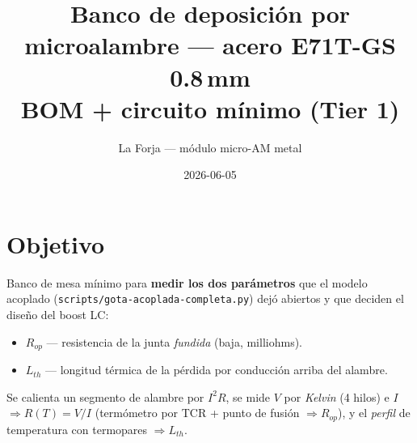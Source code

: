 \documentclass[11pt]{article}
\title{Banco de deposici\'on por microalambre --- acero E71T-GS 0.8\,mm\\
\large BOM + circuito m\'inimo (Tier 1)}
\author{La Forja --- m\'odulo micro-AM metal}
\date{2026-06-05}
\begin{document}
\maketitle

\section*{Objetivo}
Banco de mesa m\'inimo para \textbf{medir los dos par\'ametros} que el modelo acoplado
(\texttt{scripts/gota-acoplada-completa.py}) dej\'o abiertos y que deciden el dise\~no del
boost LC:
\begin{itemize}
  \item $R_{op}$ --- resistencia de la junta \emph{fundida} (baja, milliohms).
  \item $L_{th}$ --- longitud t\'ermica de la p\'erdida por conducci\'on arriba del alambre.
\end{itemize}
Se calienta un segmento de alambre por $I^2R$, se mide $V$ por \emph{Kelvin} (4 hilos) e $I$
$\Rightarrow R(T)=V/I$ (term\'ometro por TCR + punto de fusi\'on $\Rightarrow R_{op}$), y el
\emph{perfil} de temperatura con termopares $\Rightarrow L_{th}$.
\end{document}
